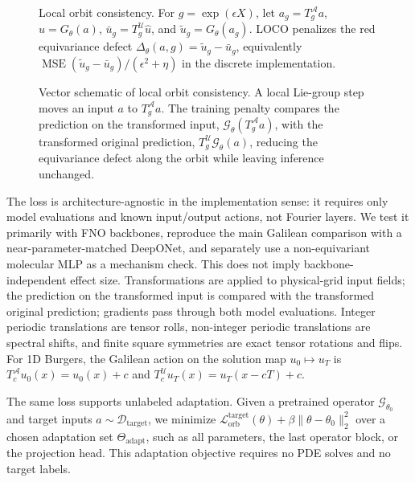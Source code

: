 \begin{figure}[t]
{%
}

\caption{
Local orbit consistency.
For \(g=\exp(\epsilon X)\), let
\(a_g=T_g^{\mathcal A}a\),
\(\hat u=G_\theta(a)\),
\(\bar u_g=T_g^{\mathcal U}\hat u\), and
\(\tilde u_g=G_\theta(a_g)\).
LOCO penalizes the red equivariance defect
\(\Delta_\theta(a,g)=\tilde u_g-\bar u_g\), equivalently
\(\operatorname{MSE}(\tilde u_g-\bar u_g)/(\epsilon^2+\eta)\) in the
discrete implementation.
}
\label{fig:loco-intuition}
\end{figure}

\begin{figure}[t]
\centering

\caption{Vector schematic of local orbit consistency. A local Lie-group step moves an input \(a\) to \(T_g^{\mathcal A}a\). The training penalty compares the prediction on the transformed input, \(\mathcal G_\theta(T_g^{\mathcal A}a)\), with the transformed original prediction, \(T_g^{\mathcal U}\mathcal G_\theta(a)\), reducing the equivariance defect along the orbit while leaving inference unchanged.}
\label{fig:orbit-consistency-diagram}
\end{figure}

The loss is architecture-agnostic in the implementation sense: it requires only model evaluations and known input/output actions, not Fourier layers. We test it primarily with FNO backbones, reproduce the main Galilean comparison with a near-parameter-matched DeepONet, and separately use a non-equivariant molecular MLP as a mechanism check. This does not imply backbone-independent effect size. Transformations are applied to physical-grid input fields; the prediction on the transformed input is compared with the transformed original prediction; gradients pass through both model evaluations. Integer periodic translations are tensor rolls, non-integer periodic translations are spectral shifts, and finite square symmetries are exact tensor rotations and flips. For 1D Burgers, the Galilean action on the solution map \(u_0\mapsto u_T\) is \(T_c^{\mathcal A}u_0(x)=u_0(x)+c\) and \(T_c^{\mathcal U}u_T(x)=u_T(x-cT)+c\).

The same loss supports unlabeled adaptation. Given a pretrained operator \(\mathcal G_{\theta_0}\) and target inputs \(a\sim\mathcal D_{\mathrm{target}}\), we minimize \(\mathcal L_{\mathrm{orb}}^{\mathrm{target}}(\theta)+\beta\|\theta-\theta_0\|_2^2\) over a chosen adaptation set \(\Theta_{\mathrm{adapt}}\), such as all parameters, the last operator block, or the projection head. This adaptation objective requires no PDE solves and no target labels.
